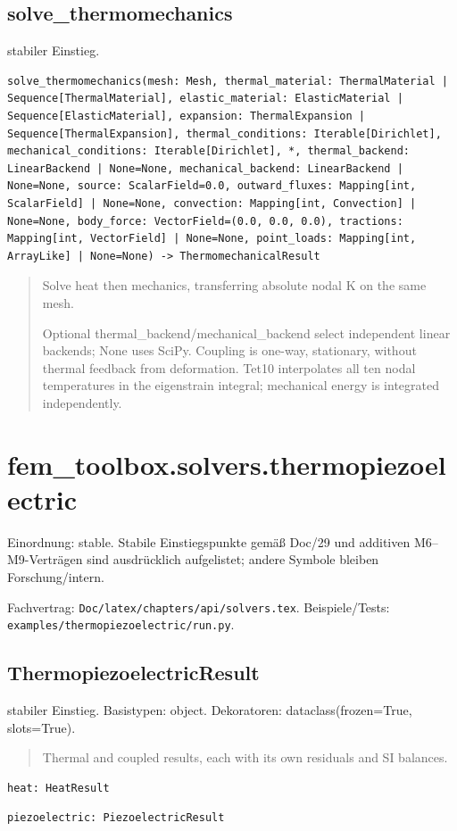 \subsection{solve\_thermomechanics}
stabiler Einstieg.
\begin{lstlisting}
solve_thermomechanics(mesh: Mesh, thermal_material: ThermalMaterial | Sequence[ThermalMaterial], elastic_material: ElasticMaterial | Sequence[ElasticMaterial], expansion: ThermalExpansion | Sequence[ThermalExpansion], thermal_conditions: Iterable[Dirichlet], mechanical_conditions: Iterable[Dirichlet], *, thermal_backend: LinearBackend | None=None, mechanical_backend: LinearBackend | None=None, source: ScalarField=0.0, outward_fluxes: Mapping[int, ScalarField] | None=None, convection: Mapping[int, Convection] | None=None, body_force: VectorField=(0.0, 0.0, 0.0), tractions: Mapping[int, VectorField] | None=None, point_loads: Mapping[int, ArrayLike] | None=None) -> ThermomechanicalResult
\end{lstlisting}
\begin{quote}
Solve heat then mechanics, transferring absolute nodal K on the same mesh.\par Optional thermal\_backend/mechanical\_backend select independent linear backends; None uses SciPy. Coupling is one-way, stationary, without thermal feedback from deformation. Tet10 interpolates all ten nodal temperatures in the eigenstrain integral; mechanical energy is integrated independently.
\end{quote}
\section{fem\_toolbox.solvers.thermopiezoelectric}
Einordnung: stable. Stabile Einstiegspunkte gemäß Doc/29 und additiven M6–M9-Verträgen sind ausdrücklich aufgelistet; andere Symbole bleiben Forschung/intern.
\par Fachvertrag: \nolinkurl{Doc/latex/chapters/api/solvers.tex}. Beispiele/Tests:
\nolinkurl{examples/thermopiezoelectric/run.py}.
\subsection{ThermopiezoelectricResult}
stabiler Einstieg.
Basistypen: object. Dekoratoren: dataclass(frozen=True, slots=True).
\begin{quote}
Thermal and coupled results, each with its own residuals and SI balances.
\end{quote}
\begin{lstlisting}
heat: HeatResult
\end{lstlisting}
\begin{lstlisting}
piezoelectric: PiezoelectricResult
\end{lstlisting}
